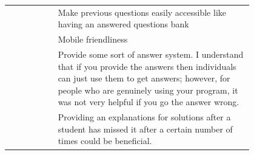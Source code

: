 \begin{longtable}{r|p{0.8\linewidth}}
		& Make previous questions easily accessible like having an answered questions bank                                                                                                                                                                                                                                                                                                                                                                                                                                                                                                                                                                                                                                                                 \\
		& Mobile friendliness                                                                                                                                                                                                                                                                                                                                                                                                                                                                                                                                                                                                                                                                                                                              \\
		& Provide some sort of answer system. I understand that if you provide the answers then individuals can just use them to get answers; however, for people who are genuinely using your program, it was not very helpful if you go the answer wrong.                                                                                                                                                                                                                                                                                                                                                                                                                                                                                                \\
		& Providing an explanations for solutions after a student has missed it after a certain number of times could be beneficial.                                                                                                                                                                                                                                                                                                                                                                                                                                                                                                                                                                                                                       \\

\end{longtable}
